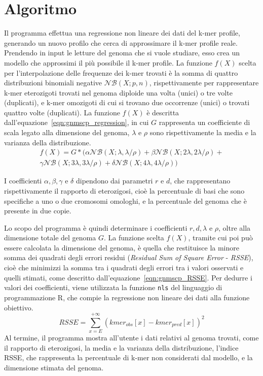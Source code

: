 \documentclass[crop=false, class=book]{standalone}
\begin{document}
	\section{Algoritmo}
	Il programma effettua una regressione non lineare dei dati del k-mer profile, generando un nuovo profilo che cerca di approssimare il k-mer profile reale. Prendendo in input le letture del genoma che si vuole studiare, esso crea un modello che approssimi il più possibile il k-mer profile. La funzione $f(X)$ scelta per l'interpolazione delle frequenze dei k-mer trovati è la somma di quattro distribuzioni binomiali negative $\mathcal{NB}(X;p,n)$, rispettivamente per rappresentare k-mer eterozigoti trovati nel genoma diploide una volta (unici) o tre volte (duplicati), e k-mer omozigoti di cui si trovano due occorrenze (unici) o trovati quattro volte (duplicati). La funzione $f(X)$ è descritta dall'equazione~\vref{eqn:gnmscp_regression}, in cui $G$ rappresenta un coefficiente di scala legato alla dimensione del genoma, $\lambda$ e $\rho$ sono rispettivamente la media e la varianza della distribuzione. 
	\begin{multline}
		f(X) = G * (\alpha \mathcal{NB}(X;\lambda, \lambda/\rho) + \beta \mathcal{NB}(X;2\lambda, 2\lambda/\rho) + \\
		\gamma \mathcal{NB}(X;3\lambda, 3\lambda/\rho) + \delta \mathcal{NB}(X;4\lambda, 4\lambda/\rho)  )	
		\label{eqn:gnmscp_regression}
	\end{multline}

	I coefficienti $\alpha, \beta, \gamma$ e $\delta$ dipendono dai parametri $r$ e $d$, che rappresentano rispettivamente il rapporto di eterozigosi, cioè la percentuale di basi che sono specifiche a uno o due cromosomi omologhi, e la percentuale del genoma che è presente in due copie.
	
	Lo scopo del programma è quindi determinare i coefficienti $r, d, \lambda$ e $\rho$, oltre alla dimensione totale del genoma $G$. La funzione scelta $f(X)$, tramite cui poi può essere calcolata la dimensione del genoma, è quella che restituisce la minore somma dei quadrati degli errori residui (\textit{Residual Sum of Square Error} - \textit{RSSE}), cioè che minimizzi la somma tra i quadrati degli errori tra i valori osservati e quelli stimati, come descritto dall'equazione~\vref{eqn:gnmscp_RSSE}. Per dedurre i valori dei coefficienti, viene utilizzata la funzione \verb|nls| del linguaggio di programmazione R, che compie la regressione non lineare dei dati alla funzione obiettivo.
	\begin{equation}
		RSSE = \sum_{x=E}^{+\infty} \left(kmer_{obs}[x] - kmer_{pred}[x]\right)^2
	\label{eqn:gnmscp_RSSE}
	\end{equation}
	Al termine, il programma mostra all'utente i dati relativi al genoma trovati, come il rapporto di eterozigosi, la media e la varianza della distribuzione, l'indice RSSE, che rappresenta la percentuale di k-mer non considerati dal modello, e la dimensione stimata del genoma.
	
\end{document}
